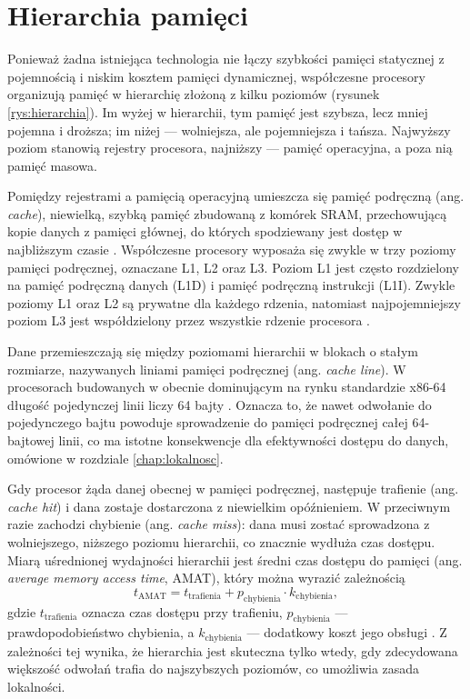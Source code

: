 \documentclass[a4paper,12pt]{book} %
\begin{document}
\section{Hierarchia pamięci}
\label{sec:hierarchia}

Ponieważ żadna istniejąca technologia nie łączy szybkości pamięci statycznej z pojemnością i niskim kosztem pamięci dynamicznej, współczesne procesory organizują pamięć w hierarchię złożoną z kilku poziomów (rysunek \ref{rys:hierarchia}). Im wyżej w hierarchii, tym pamięć jest szybsza, lecz mniej pojemna i droższa; im niżej --- wolniejsza, ale pojemniejsza i tańsza. Najwyższy poziom stanowią rejestry procesora, najniższy --- pamięć operacyjna, a poza nią pamięć masowa.

Pomiędzy rejestrami a pamięcią operacyjną umieszcza się pamięć podręczną (ang. \emph{cache}), niewielką, szybką pamięć zbudowaną z komórek SRAM, przechowującą kopie danych z pamięci głównej, do których spodziewany jest dostęp w najbliższym czasie \cite{drepper2007memory}. Współczesne procesory wyposaża się zwykle w trzy poziomy pamięci podręcznej, oznaczane L1, L2 oraz L3. Poziom L1 jest często rozdzielony na pamięć podręczną danych (L1D) i pamięć podręczną instrukcji (L1I). Zwykle poziomy L1 oraz L2 są prywatne dla każdego rdzenia, natomiast najpojemniejszy poziom L3 jest współdzielony przez wszystkie rdzenie procesora \cite{evers2022zen3}.

Dane przemieszczają się między poziomami hierarchii w blokach o stałym rozmiarze, nazywanych liniami pamięci podręcznej (ang. \emph{cache line}). W procesorach budowanych w obecnie dominującym na rynku standardzie x86-64 długość pojedynczej linii liczy 64 bajty \cite{drepper2007memory}. Oznacza to, że nawet odwołanie do pojedynczego bajtu powoduje sprowadzenie do pamięci podręcznej całej 64-bajtowej linii, co ma istotne konsekwencje dla efektywności dostępu do danych, omówione w rozdziale \ref{chap:lokalnosc}.

Gdy procesor żąda danej obecnej w pamięci podręcznej, następuje trafienie (ang. \emph{cache hit}) i dana zostaje dostarczona z niewielkim opóźnieniem. W przeciwnym razie zachodzi chybienie (ang. \emph{cache miss}): dana musi zostać sprowadzona z wolniejszego, niższego poziomu hierarchii, co znacznie wydłuża czas dostępu. Miarą uśrednionej wydajności hierarchii jest średni czas dostępu do pamięci (ang. \emph{average memory access time}, AMAT), który można wyrazić zależnością
\[
  t_{\mathrm{AMAT}} = t_{\mathrm{trafienia}} + p_{\mathrm{chybienia}} \cdot k_{\mathrm{chybienia}},
\]
gdzie $t_{\mathrm{trafienia}}$ oznacza czas dostępu przy trafieniu, $p_{\mathrm{chybienia}}$ --- prawdopodobieństwo chybienia, a $k_{\mathrm{chybienia}}$ --- dodatkowy koszt jego obsługi \cite{hennessy2017architecture}. Z zależności tej wynika, że hierarchia jest skuteczna tylko wtedy, gdy zdecydowana większość odwołań trafia do najszybszych poziomów, co umożliwia zasada lokalności.
\end{document}

